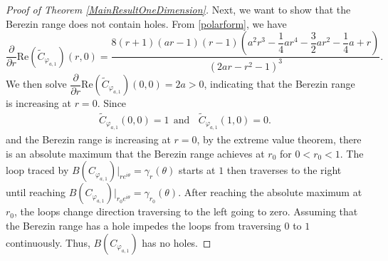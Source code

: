 \documentclass{amsart}
\theoremstyle{remark}
\begin{document}
\begin{proof}[Proof of Theorem \ref{MainResultOneDimension}]
Next, we want to show that the Berezin range does not contain holes. From \eqref{polarform}, we have 
\[\dfrac{\partial}{\partial r}\mathrm{Re}(\widetilde{C}_{\varphi_{a,1}})(r,0)=\dfrac{8(r+1)(ar-1)(r-1)\left(a^2r^3-\dfrac{1}{4}ar^4-\dfrac{3}{2}ar^2-\dfrac{1}{4}a+r\right)}{(2ar-r^2-1)^3}.\]
We then solve $\dfrac{\partial}{\partial r}\mathrm{Re}(\widetilde{C}_{\varphi_{a,1}})(0,0) =2a>0$, indicating that the Berezin range is increasing at $r=0$. Since
\begin{align*}
\widetilde{C}_{\varphi_{a,1}}(0,0)=1\ \ \mathrm{and}\ \ \ \ \widetilde{C}_{\varphi_{a,1}}(1,0)=0.
\end{align*}
and the Berezin range is increasing at $r=0$, by the extreme value theorem, there is an absolute maximum that the Berezin range achieves at $r_0$ for $0<r_0<1$. The loop traced by $B(C_{\varphi_{a,1}})|_{re^{i\theta}}=\gamma_r(\theta)$ starts at $1$ then traverses to the right until reaching $B(C_{\varphi_{a,1}})|_{r_0e^{i\theta}}=\gamma_{r_0}(\theta)$. After reaching the absolute maximum at $r_0$, the loops change direction traversing to the left going to zero. Assuming that the Berezin range has a hole impedes the loops from traversing $0$ to $1$ continuously. Thus, $B(C_{\varphi_{a,1}})$ has no holes.


\end{proof}
\end{document}
